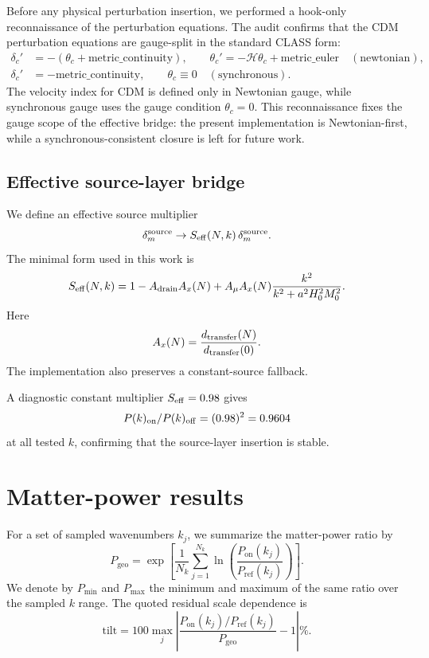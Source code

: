﻿\documentclass[11pt,prd,preprint,nofootinbib,amsmath,amssymb]{revtex4-2}
\newcommand{\Seff}{S_{\rm eff}}
\begin{document}
Before any physical perturbation insertion, we performed a hook-only
reconnaissance of the perturbation equations. The audit confirms that the CDM
perturbation equations are gauge-split in the standard CLASS form:
\begin{align}
\delta_c'&=-(\theta_c+\text{metric\_continuity}),\qquad
\theta_c'=-\mathcal H\theta_c+\text{metric\_euler}
\quad (\text{newtonian}),\\
\delta_c'&=-\text{metric\_continuity},\qquad \theta_c\equiv0
\quad (\text{synchronous}).
\end{align}
The velocity index for CDM is defined only in Newtonian gauge, while synchronous
gauge uses the gauge condition $\theta_c=0$. This reconnaissance fixes the
gauge scope of the effective bridge: the present implementation is
Newtonian-first, while a synchronous-consistent closure is left for future work.

\subsection{Effective source-layer bridge}

We define an effective source multiplier
\begin{equation}
\delta_m^{\rm source}
\rightarrow
\Seff(N,k)\,\delta_m^{\rm source}.
\end{equation}
The minimal form used in this work is
\begin{equation}
\Seff(N,k)
=
1
-
A_{\rm drain}A_x(N)
+
A_\mu A_x(N)
\frac{k^2}{k^2+a^2H_0^2M_0^2}.
\label{eq:seff}
\end{equation}
Here
\begin{equation}
A_x(N)=\frac{d_{\rm transfer}(N)}{d_{\rm transfer}(0)}.
\end{equation}
The implementation also preserves a constant-source fallback.

A diagnostic constant multiplier $\Seff=0.98$ gives
\begin{equation}
P(k)_{\rm on}/P(k)_{\rm off}=(0.98)^2=0.9604
\end{equation}
at all tested $k$, confirming that the source-layer insertion is stable.

\section{Matter-power results}
\label{sec:results}

For a set of sampled wavenumbers $k_j$, we summarize the matter-power ratio by
\begin{equation}
P_{\mathrm{geo}}
=
\exp\left[
\frac{1}{N_k}
\sum_{j=1}^{N_k}
\ln\left(\frac{P_{\mathrm{on}}(k_j)}{P_{\mathrm{ref}}(k_j)}\right)
\right].
\end{equation}
We denote by $P_{\min}$ and $P_{\max}$ the minimum and maximum of the same
ratio over the sampled $k$ range. The quoted residual scale dependence is
\begin{equation}
\mathrm{tilt}
=
100
\max_j
\left|
\frac{P_{\mathrm{on}}(k_j)/P_{\mathrm{ref}}(k_j)}
{P_{\mathrm{geo}}}
-1
\right|\%.
\end{equation}
\end{document}
